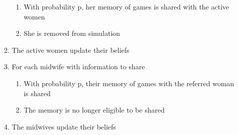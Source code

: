 \begin{enumerate}
\begin{enumerate}
	\begin{enumerate}
		\item With probability p, her memory of games is shared with the active women
		\item She is removed from simulation
	\end{enumerate}
	\item The active women update their beliefs
	\item For each midwife with information to share
	\begin{enumerate}
		\item With probability p, their memory of games with the referred woman is shared
		\item The memory is no longer eligible to be shared
	\end{enumerate}
	\item The midwives update their beliefs
\end{enumerate}
\end{enumerate}